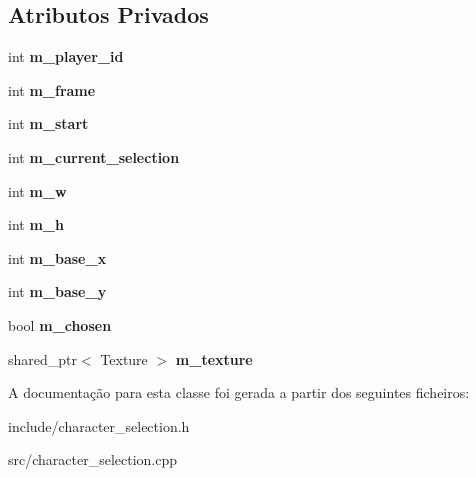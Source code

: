 \subsection*{Atributos Privados}
\begin{DoxyCompactItemize}
\item 
\mbox{\label{classCharacterSelection_a952c2ea6bcda9f86e5af153180c4e1ff}} 
int {\bfseries m\+\_\+player\+\_\+id}
\item 
\mbox{\label{classCharacterSelection_aa55f4689637450838d51090e921e036f}} 
int {\bfseries m\+\_\+frame}
\item 
\mbox{\label{classCharacterSelection_a99178a5ff9afda03b0c19ca72ed9aa41}} 
int {\bfseries m\+\_\+start}
\item 
\mbox{\label{classCharacterSelection_a85f71f1b73dc6b86bcbc29eadd3a9ad7}} 
int {\bfseries m\+\_\+current\+\_\+selection}
\item 
\mbox{\label{classCharacterSelection_ab48182d2234ec3ccefb92b8554047d5c}} 
int {\bfseries m\+\_\+w}
\item 
\mbox{\label{classCharacterSelection_ac423f89e0a3432551f500944366f7bad}} 
int {\bfseries m\+\_\+h}
\item 
\mbox{\label{classCharacterSelection_aeb7a11351418002b57587f6abed12a00}} 
int {\bfseries m\+\_\+base\+\_\+x}
\item 
\mbox{\label{classCharacterSelection_a09610c3c8cca5a24ba210131aaa4b1c8}} 
int {\bfseries m\+\_\+base\+\_\+y}
\item 
\mbox{\label{classCharacterSelection_aadc3d49c3cee49de9b3c886cac52897e}} 
bool {\bfseries m\+\_\+chosen}
\item 
\mbox{\label{classCharacterSelection_a31044c8efa146c6b1d19daf355645901}} 
shared\+\_\+ptr$<$ Texture $>$ {\bfseries m\+\_\+texture}
\end{DoxyCompactItemize}


A documentação para esta classe foi gerada a partir dos seguintes ficheiros\+:\begin{DoxyCompactItemize}
\item 
include/character\+\_\+selection.\+h\item 
src/character\+\_\+selection.\+cpp\end{DoxyCompactItemize}
